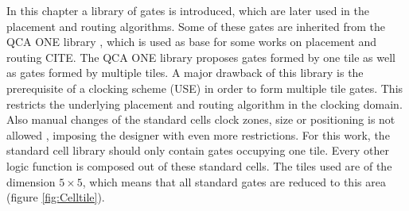 In this chapter a library of gates is introduced, which are later used in the placement and routing algorithms. Some of these gates are inherited from the QCA ONE library \cite{QCA_scl}, which is used as base for some works on placement and routing CITE.
The QCA ONE library proposes gates formed by one tile as well as gates formed by multiple tiles. A major drawback of this library is the prerequisite of a clocking scheme (USE) in order to form multiple tile gates. This restricts the underlying placement and routing algorithm in the clocking domain. Also manual changes of the standard cells clock zones, size or positioning is not allowed \cite{QCA_scl}, imposing the designer with even more restrictions. For this work, the standard cell library should only contain gates occupying one tile. Every other logic function is composed out of these standard cells. The tiles used are of the dimension $5 \times 5$, which means that all standard gates are reduced to this area (figure \ref{fig:Celltile}).\\
